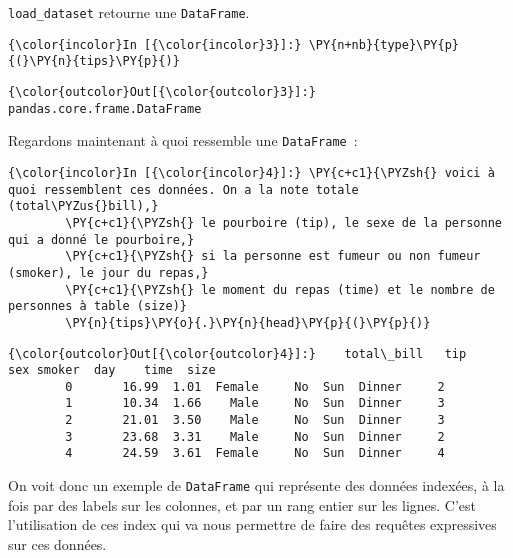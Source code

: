     \texttt{load\_dataset} retourne une \texttt{DataFrame}.

    \begin{Verbatim}[commandchars=\\\{\},frame=single,framerule=0.3mm,rulecolor=\color{cellframecolor}]
{\color{incolor}In [{\color{incolor}3}]:} \PY{n+nb}{type}\PY{p}{(}\PY{n}{tips}\PY{p}{)}
\end{Verbatim}


\begin{Verbatim}[commandchars=\\\{\},frame=single,framerule=0.3mm,rulecolor=\color{cellframecolor}]
{\color{outcolor}Out[{\color{outcolor}3}]:} pandas.core.frame.DataFrame
\end{Verbatim}
            
    Regardons maintenant à quoi ressemble une \texttt{DataFrame}~:

    \begin{Verbatim}[commandchars=\\\{\},frame=single,framerule=0.3mm,rulecolor=\color{cellframecolor}]
{\color{incolor}In [{\color{incolor}4}]:} \PY{c+c1}{\PYZsh{} voici à quoi ressemblent ces données. On a la note totale (total\PYZus{}bill),}
        \PY{c+c1}{\PYZsh{} le pourboire (tip), le sexe de la personne qui a donné le pourboire,}
        \PY{c+c1}{\PYZsh{} si la personne est fumeur ou non fumeur (smoker), le jour du repas,}
        \PY{c+c1}{\PYZsh{} le moment du repas (time) et le nombre de personnes à table (size)}
        \PY{n}{tips}\PY{o}{.}\PY{n}{head}\PY{p}{(}\PY{p}{)}
\end{Verbatim}


\begin{Verbatim}[commandchars=\\\{\},frame=single,framerule=0.3mm,rulecolor=\color{cellframecolor}]
{\color{outcolor}Out[{\color{outcolor}4}]:}    total\_bill   tip     sex smoker  day    time  size
        0       16.99  1.01  Female     No  Sun  Dinner     2
        1       10.34  1.66    Male     No  Sun  Dinner     3
        2       21.01  3.50    Male     No  Sun  Dinner     3
        3       23.68  3.31    Male     No  Sun  Dinner     2
        4       24.59  3.61  Female     No  Sun  Dinner     4
\end{Verbatim}
            
    On voit donc un exemple de \texttt{DataFrame} qui représente des données
indexées, à la fois par des labels sur les colonnes, et par un rang
entier sur les lignes. C'est l'utilisation de ces index qui va nous
permettre de faire des requêtes expressives sur ces données.

